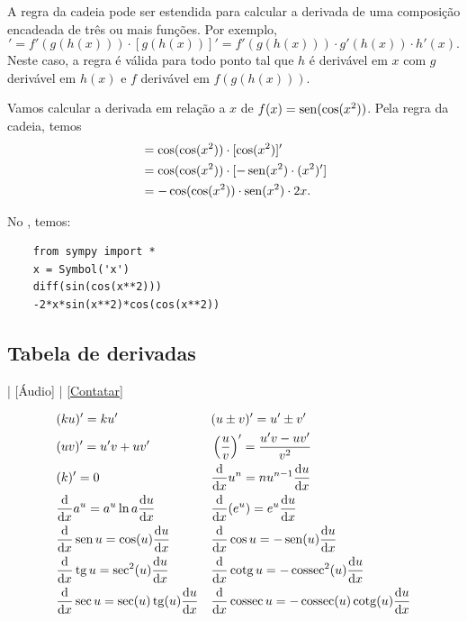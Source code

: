 A regra da cadeia pode ser estendida para calcular a derivada de uma composição encadeada de três ou mais funções. Por exemplo,
\begin{equation}
  [f(g(h(x)))]' = f'(g(h(x)))\cdot[g(h(x))]' = f'(g(h(x)))\cdot g'(h(x))\cdot h'(x).
\end{equation}
Neste caso, a regra é válida para todo ponto tal que $h$ é derivável em $x$ com $g$ derivável em $h(x)$ e $f$ derivável em $f(g(h(x)))$.

\begin{ex}
  Vamos calcular a derivada em relação a $x$ de $f(x) = \operatorname{sen}(\cos(x^2))$. Pela regra da cadeia, temos
  \begin{align}
    [\sen(\cos(x^2))] &= \cos(\cos(x^2))\cdot[\cos(x^2)]' \\
                    &= \cos(\cos(x^2))\cdot [-\sen(x^2)\cdot (x^2)'] \\
                    &= -\cos(\cos(x^2))\cdot\sen(x^2)\cdot 2x.
  \end{align}

  \ifispython
  No \sympy, temos:
  \begin{lstlisting}
    from sympy import *
    x = Symbol('x')
    diff(sin(cos(x**2)))
    -2*x*sin(x**2)*cos(cos(x**2))
  \end{lstlisting}
  \fi  
\end{ex}

\subsection{Tabela de derivadas}

\begin{flushright}
  [Vídeo] | [Áudio] | \href{https://phkonzen.github.io/notas/contato.html}{[Contatar]}
\end{flushright}

\begin{align}
  & (ku)' = ku' && (u\pm v)' = u' \pm v'\\
  & (uv)' = u'v + uv' && \left(\frac{u}{v}\right)' = \frac{u'v - uv'}{v^2} \\
  & (k)' = 0 && \frac{\mathrm{d}}{\mathrm{d} x}u^n = nu^{n-1}\frac{\mathrm{d} u}{\mathrm{d} x}\\
  & \frac{\mathrm{d}}{\mathrm{d} x}a^u = a^u\ln a\frac{\mathrm{d} u}{\mathrm{d} x} && \frac{\mathrm{d}}{\mathrm{d} x}(e^u) = e^u\frac{\mathrm{d} u}{\mathrm{d} x} \\
  & \frac{\mathrm{d}}{\mathrm{d} x}\operatorname{sen} u = \cos(u)\frac{\mathrm{d} u}{\mathrm{d} x} && \frac{\mathrm{d}}{\mathrm{d} x}\cos u = - \operatorname{sen}(u)\frac{\mathrm{d} u}{\mathrm{d} x}\\
  & \frac{\mathrm{d}}{\mathrm{d} x}\operatorname{tg} u = \sec^2(u)\frac{\mathrm{d} u}{\mathrm{d} x} && \frac{\mathrm{d}}{\mathrm{d} x}\operatorname{cotg} u = -\operatorname{cossec}^2(u)\frac{\mathrm{d} u}{\mathrm{d} x} \\
  & \frac{\mathrm{d}}{\mathrm{d} x}\sec u = \sec(u)\operatorname{tg}(u)\frac{\mathrm{d} u}{\mathrm{d} x} && \frac{\mathrm{d}}{\mathrm{d} x}\operatorname{cossec} u = -\operatorname{cossec}(u)\operatorname{cotg}(u)\frac{\mathrm{d} u}{\mathrm{d} x}
\end{align}

